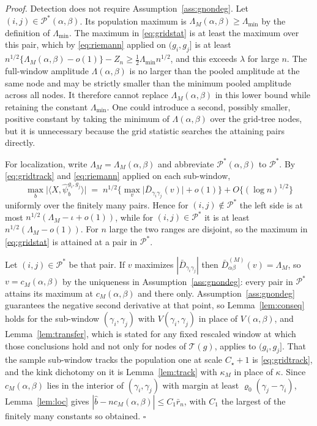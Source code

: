 \documentclass[12pt, a4paper]{article}
\newcommand{\qed}{\hfill$\square$}
\newenvironment{proof}[1][Proof]{\par\noindent\textit{#1.}\space}{\qed\par\medskip}
\begin{document}
\begin{proof}
Detection does not require Assumption~\ref{ass:gnondeg}. Let
$(i,j)\in\mathcal{P}^*(\alpha,\beta)$. Its population maximum is
$\Lambda_M(\alpha,\beta)\ge\Lambda_{\min}$ by the definition of
$\Lambda_{\min}$. The maximum in \eqref{eq:gridstat} is at least the maximum
over this pair, which by \eqref{eq:riemann} applied on $(g_i,g_j]$ is at least
$n^{1/2}\{\Lambda_M(\alpha,\beta)-o(1)\}-Z_n
\ge\tfrac12\Lambda_{\min}n^{1/2}$, and this exceeds $\lambda$ for large $n$.
The full-window amplitude $\Lambda(\alpha,\beta)$ is no larger than the pooled
amplitude at the same node and may be strictly smaller than the minimum pooled
amplitude across all nodes. It therefore cannot replace
$\Lambda_M(\alpha,\beta)$ in this lower bound while retaining the constant
$\Lambda_{\min}$. One could introduce a second, possibly smaller, positive
constant by taking the minimum of $\Lambda(\alpha,\beta)$ over the grid-tree
nodes, but it is unnecessary because the grid statistic searches the
attaining pairs directly.

For localization, write $\Lambda_M = \Lambda_M(\alpha,\beta)$ and abbreviate
$\mathcal{P}^*(\alpha,\beta)$ to $\mathcal{P}^*$. By
\eqref{eq:gridtrack} and \eqref{eq:riemann} applied on each sub-window,
\[
\max_b \big| \langle X, \hat\psi^{g_i,g_j}_b \rangle \big|
\;=\; n^{1/2} \Big\{ \max_v \big| \bar D_{\gamma_i\gamma_j}(v) \big|
+ o(1) \Big\} + O\{(\log n)^{1/2}\}
\]
uniformly over the finitely many pairs. Hence for $(i,j) \notin \mathcal{P}^*$
the left side is at most $n^{1/2}(\Lambda_M - \iota + o(1))$, while for
$(i,j) \in \mathcal{P}^*$ it is at least $n^{1/2}(\Lambda_M - o(1))$. For $n$
large the two ranges are disjoint, so the maximum in \eqref{eq:gridstat} is
attained at a pair in $\mathcal{P}^*$.

Let $(i,j) \in \mathcal{P}^*$ be that pair. If $v$ maximizes
$|\bar D_{\gamma_i\gamma_j}|$ then $\bar D^{(M)}_{\alpha\beta}(v) = \Lambda_M$,
so $v = c_M(\alpha,\beta)$ by the uniqueness in
Assumption~\ref{ass:gnondeg}: every pair in $\mathcal{P}^*$ attains its maximum
at $c_M(\alpha,\beta)$ and there only. Assumption~\ref{ass:gnondeg} guarantees the negative second derivative at that point, so Lemma~\ref{lem:conseq} holds for the sub-window $(\gamma_i,\gamma_j)$ with $V(\gamma_i,\gamma_j)$ in place of $V(\alpha,\beta)$, and Lemma~\ref{lem:transfer}, which is stated for any fixed rescaled window at which those conclusions hold and not only for nodes of $\mathcal{T}(g)$, applies to $(g_i,g_j]$. That the sample sub-window tracks the population one at scale $C_\star+1$ is \eqref{eq:gridtrack}, and the kink dichotomy on it is Lemma~\ref{lem:track} with $\kappa_M$ in place of $\kappa$. Since
$c_M(\alpha,\beta)$ lies in the interior of $(\gamma_i,\gamma_j)$ with margin
at least $\varrho_0(\gamma_j - \gamma_i)$, Lemma~\ref{lem:loc} gives
$|\hat b - n c_M(\alpha,\beta)| \le C_1\bar r_n$, with $C_1$ the largest of the
finitely many constants so obtained.
\end{proof}
\end{document}
